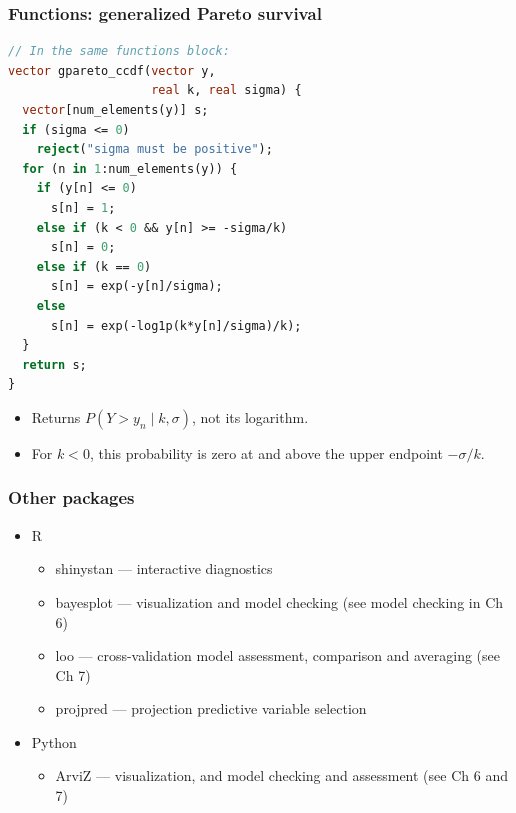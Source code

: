\documentclass[10pt]{beamer}
\begin{document}
\begin{frame}[fragile]
\frametitle{Functions: generalized Pareto survival}
  {\footnotesize
  \begin{lstlisting}[language=Stan]
// In the same functions block:
vector gpareto_ccdf(vector y,
                    real k, real sigma) {
  vector[num_elements(y)] s;
  if (sigma <= 0)
    reject("sigma must be positive");
  for (n in 1:num_elements(y)) {
    if (y[n] <= 0)
      s[n] = 1;
    else if (k < 0 && y[n] >= -sigma/k)
      s[n] = 0;
    else if (k == 0)
      s[n] = exp(-y[n]/sigma);
    else
      s[n] = exp(-log1p(k*y[n]/sigma)/k);
  }
  return s;
}
  \end{lstlisting}
}
\begin{itemize}
\item Returns $P(Y>y_n\mid k,\sigma)$, not its logarithm.
\item For $k<0$, this probability is zero at and above the upper endpoint $-\sigma/k$.
\end{itemize}
\end{frame}



\begin{frame}[fragile]

\frametitle{Other packages}

  \begin{itemize}
  \item R
    \begin{itemize}
    \item shinystan --- interactive diagnostics
    \item bayesplot --- visualization and model checking (see model checking in Ch 6)
    \item loo --- cross-validation model assessment, comparison and averaging (see Ch 7)
    \item projpred --- projection predictive variable selection
    \end{itemize}
    \vspace{\baselineskip}
  \item Python
    \begin{itemize}
    \item ArviZ --- visualization, and model checking and assessment (see Ch 6 and 7)
    \end{itemize}
  \end{itemize}

\end{frame}
\end{document}
